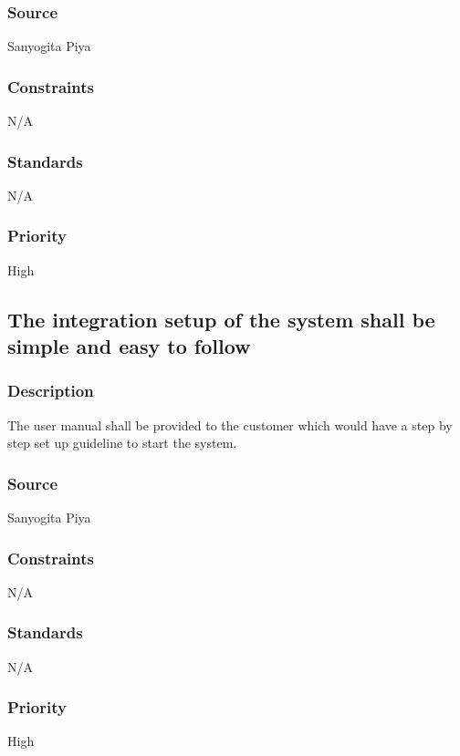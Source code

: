 \subsubsection{Source}
Sanyogita Piya
\subsubsection{Constraints}
N/A
\subsubsection{Standards}
N/A
\subsubsection{Priority}
High


\subsection{The integration setup of the system shall be simple and easy to follow}
\subsubsection{Description}
The user manual shall be provided to the customer which would have a step by step set up guideline to start the system.
\subsubsection{Source}
Sanyogita Piya
\subsubsection{Constraints}
N/A
\subsubsection{Standards}
N/A
\subsubsection{Priority}
High
